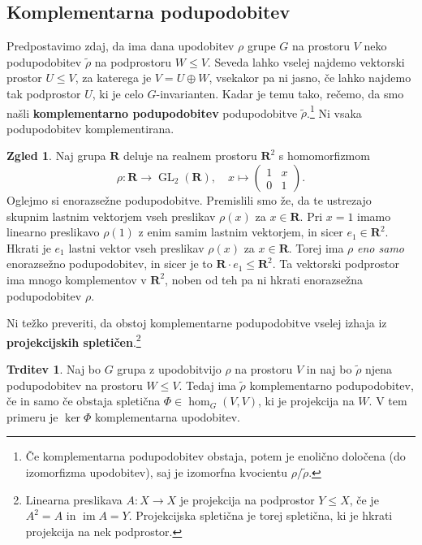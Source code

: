 \documentclass[11pt]{book}
\def\RR{\mathbf{R}}
\DeclareMathOperator\image{im}
\DeclareMathOperator\GL{GL}
\def\definicija{\color{rdeca}\bf}
\theoremstyle{definition}
\theoremstyle{zgled}
\newtheorem{zgled}[theorem]{Zgled}
\theoremstyle{zgledbrezstevilke}
\theoremstyle{odprtproblem}
\theoremstyle{domacanaloga}
\theoremstyle{izrek}
\newtheorem{trditev}[theorem]{Trditev}
\begin{document}
\subsection{Komplementarna podupodobitev}

Predpostavimo zdaj, da ima dana upodobitev $\rho$ grupe $G$ na prostoru $V$ neko podupodobitev $\tilde\rho$ na podprostoru $W \leq V$. Seveda lahko vselej najdemo vektorski prostor $U \leq V$, za katerega je $V = U \oplus W$, vsekakor pa ni jasno, če lahko najdemo tak podprostor $U$, ki je celo $G$-invarianten. Kadar je temu tako, rečemo, da smo našli {\definicija komplementarno podupodobitev} podupodobitve $\tilde\rho$.\footnote{Če komplementarna podupodobitev obstaja, potem je enolično določena (do izomorfizma upodobitev), saj je izomorfna kvocientu $\rho/\tilde\rho$.} Ni vsaka podupodobitev komplementirana.

\begin{zgled}
Naj grupa $\RR$ deluje na realnem prostoru $\RR^2$ s homomorfizmom
    \[
        \rho \colon \RR \to {\textstyle \GL_2(\RR)}, \quad
        x \mapsto 
        \begin{pmatrix} 
        1 & x \\ 0 & 1 
    \end{pmatrix}.
\]
Oglejmo si enorazsežne podupodobitve. Premislili smo že, da te ustrezajo skupnim lastnim vektorjem vseh preslikav $\rho(x)$ za $x \in \RR$. Pri $x = 1$ imamo linearno preslikavo $\rho(1)$ z enim samim lastnim vektorjem, in sicer $e_1 \in \RR^2$. Hkrati je $e_1$ lastni vektor vseh preslikav $\rho(x)$ za $x \in \RR$. Torej ima $\rho$ \emph{eno samo} enorazsežno podupodobitev, in sicer je to $\RR \cdot e_1 \leq \RR^2$. Ta vektorski podprostor ima mnogo komplementov v $\RR^2$, noben od teh pa ni hkrati enorazsežna podupodobitev $\rho$.
\end{zgled}

Ni težko preveriti, da obstoj komplementarne podupodobitve vselej izhaja iz {\definicija projekcijskih spletičen}.\footnote{Linearna preslikava $A \colon X \to X$ je projekcija na podprostor $Y \leq X$, če je $A^2 = A$ in $\image A = Y$. Projekcijska spletična je torej spletična, ki je hkrati projekcija na nek podprostor.}

\begin{trditev}
Naj bo $G$ grupa z upodobitvijo $\rho$ na prostoru $V$ in naj bo $\tilde \rho$ njena podupodobitev na prostoru $W \leq V$. Tedaj ima $\tilde \rho$ komplementarno podupodobitev, če in samo če obstaja spletična $\Phi \in \hom_G(V,V)$, ki je projekcija na $W$. V tem primeru je $\ker \Phi$ komplementarna upodobitev.
\end{trditev}
\end{document}

